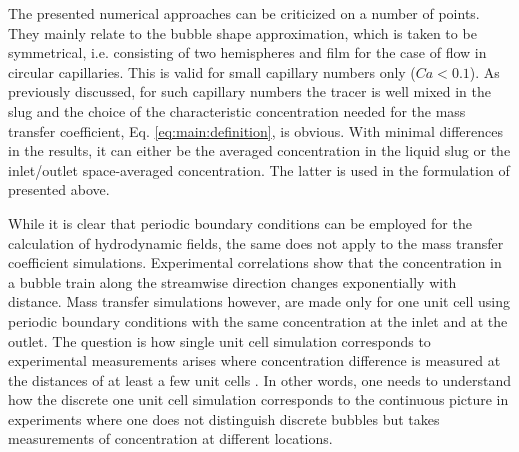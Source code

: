 \documentclass[review,12pt]{elsarticle}
\begin{document}
The presented numerical approaches \cite{vanbaten-circular,kreutzer-overview}
can be criticized on a number of points. They mainly
relate to the bubble shape approximation, which is taken to be symmetrical, i.e.
consisting of two hemispheres and film for the case of flow in circular
capillaries. This is valid  for small capillary numbers only ($Ca<0.1$). As previously
discussed, for such capillary numbers the tracer is well mixed in the slug and 
the choice of the characteristic concentration needed for the mass transfer
coefficient, Eq. \ref{eq:main:definition}, is obvious. With minimal
differences in the results, it can either be the averaged concentration in the liquid slug
or the inlet/outlet space-averaged concentration. The latter is used in the formulation
of \citet{vanbaten-circular} presented above. 

While it is clear that periodic boundary conditions can be employed for the calculation
 of hydrodynamic fields, the same does not apply to the mass transfer coefficient
simulations. Experimental correlations \cite{bercic-mass} show that the
concentration in a bubble train along the streamwise direction changes exponentially with distance.
Mass transfer simulations however, are made only for one unit cell
using periodic boundary conditions with the same concentration at the inlet
and at the outlet. The question is how single unit cell simulation corresponds to
experimental measurements arises where concentration difference is measured at
the distances of at least a few unit cells \cite{bercic-mass}. In
other words, one needs to understand how the discrete one unit cell simulation
corresponds to the continuous picture in experiments where one does not
distinguish discrete bubbles but takes measurements of concentration at different
locations.
\end{document}
